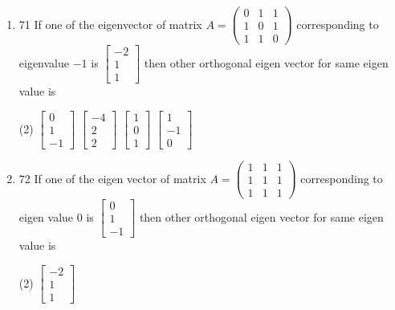\begin{enumerate}
\begin{tasks}
 \end{tasks}
 \item 71 If one of the eigenvector of matrix $A=\left(\begin{array}{lll}0 & 1 & 1 \\ 1 & 0 & 1 \\ 1 & 1 & 0\end{array}\right)$ corresponding to eigenvalue $-1$ is $\left[\begin{array}{c}-2 \\ 1 \\ 1\end{array}\right]$ then other orthogonal eigen vector for same eigen value is
  \begin{tasks}(2)
 	\task[\textbf{a.}]$\left[\begin{array}{c}0 \\ 1 \\ -1\end{array}\right]$
 	\task[\textbf{b.}]$\left[\begin{array}{c}-4 \\ 2 \\ 2\end{array}\right]$
 	\task[\textbf{c.}] $\left[\begin{array}{l}1 \\ 0 \\ 1\end{array}\right]$
 	\task[\textbf{d.}]  $\left[\begin{array}{c}1 \\ -1 \\ 0\end{array}\right]$
 \end{tasks}
 \item 72 If one of the eigen vector of matrix $A=\left(\begin{array}{lll}1 & 1 & 1 \\ 1 & 1 & 1 \\ 1 & 1 & 1\end{array}\right)$ corresponding to eigen value 0 is $\left[\begin{array}{c}0 \\ 1 \\ -1\end{array}\right]$ then other orthogonal eigen vector for same eigen value is
  \begin{tasks}(2)
 	\task[\textbf{a.}]$\left[\begin{array}{c}-2 \\ 1 \\ 1\end{array}\right]$

\end{tasks}
\end{enumerate}
